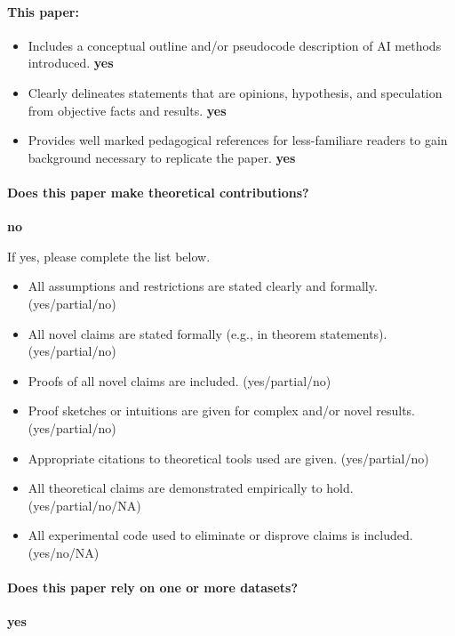 \paragraph{This paper:}
\begin{itemize}
\item Includes a conceptual outline and/or pseudocode description of AI methods introduced. {\bf yes}
\item Clearly delineates statements that are opinions, hypothesis, and speculation from objective facts and results. {\bf yes}
\item Provides well marked pedagogical references for less-familiare readers to gain background necessary to replicate the paper. {\bf yes}
\end{itemize}

\paragraph{Does this paper make theoretical contributions?} {\bf no}

If yes, please complete the list below.
\begin{itemize}
\item All assumptions and restrictions are stated clearly and formally. (yes/partial/no)
\item All novel claims are stated formally (e.g., in theorem statements). (yes/partial/no)
\item Proofs of all novel claims are included. (yes/partial/no)
\item Proof sketches or intuitions are given for complex and/or novel results. (yes/partial/no)
\item Appropriate citations to theoretical tools used are given. (yes/partial/no)
\item All theoretical claims are demonstrated empirically to hold. (yes/partial/no/NA)
\item All experimental code used to eliminate or disprove claims is included. (yes/no/NA)
\end{itemize}

\paragraph{Does this paper rely on one or more datasets?} {\bf yes}

